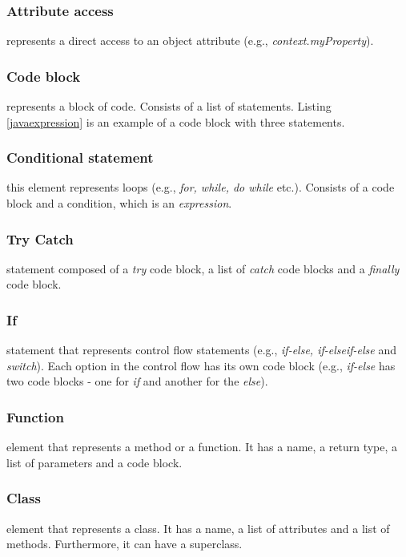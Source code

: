\subsubsection{Attribute access} represents a direct access to an object attribute (e.g., \textit{context.myProperty}).


\subsubsection{Code block} represents a block of code. Consists of a list of statements. Listing \ref{javaexpression} is an example of a code block with three statements.

\subsubsection{Conditional statement} this element represents loops (e.g., \textit{for, while, do while} etc.). Consists of a code block and a condition, which is an \textit{expression}.

\subsubsection{Try Catch} statement composed of a \textit{try} code block, a list of \textit{catch} code blocks and a \textit{finally} code block. 


\subsubsection{If} statement that represents control flow statements (e.g., \textit{if-else, if-elseif-else} and \textit{switch}). Each option in the control flow has its own code block (e.g., \textit{if-else} has two code blocks - one for \textit{if} and another for the \textit{else}).

\subsubsection{Function} element that represents a method or a function. It has a name, a return type, a list of parameters and a code block.

\subsubsection{Class} element that represents a class. It has a name, a list of attributes and a list of methods. Furthermore, it can have a superclass.


